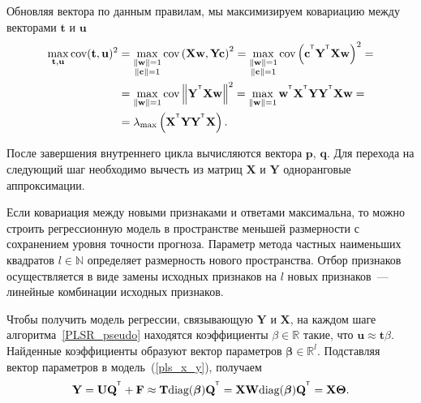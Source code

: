 \documentclass[12pt,twoside]{article}
\newcommand{\bw}{\mathbf{w}}
\newcommand{\bY}{\mathbf{Y}}
\newcommand{\bX}{\mathbf{X}}
\newcommand{\bu}{\mathbf{u}}
\newcommand{\bt}{\mathbf{t}}
\newcommand{\bp}{\mathbf{p}}
\newcommand{\bq}{\mathbf{q}}
\newcommand{\bc}{\mathbf{c}}
\newcommand{\bT}{\mathbf{T}}
\newcommand{\bQ}{\mathbf{Q}}
\newcommand{\bF}{\mathbf{F}}
\newcommand{\bU}{\mathbf{U}}
\newcommand{\bW}{\mathbf{W}}
\newcommand{\bTheta}{\boldsymbol{\Theta}}
\begin{document}
Обновляя вектора по данным правилам, мы максимизируем ковариацию между векторами $\bt$ и $\bu$
\begin{align*}
    \max_{\bt, \bu}  \text{cov} (\bt, \bu)^2 &= \max_{\substack{\|\bw\|=1 \\ \|\bc\| = 1}} \text{cov} \left( \bX \bw, \bY \bc \right)^2 = \max_{\substack{\|\bw\|=1 \\ \|\bc\| = 1}} \text{cov} \left(\bc^{\T}  \bY^{\T} \bX \bw \right)^2 = \\
    &= \max_{\|\bw\| = 1} \text{cov} \left\|\bY^{\T} \bX \bw \right\|^2 = \max_{\|\bw\| = 1} \bw^{\T} \bX^{\T} \bY \bY^{\T} \bX \bw = \\
    & = \lambda_{\max} \left( \bX^{\T} \bY \bY^{\T} \bX \right).
\end{align*}

После завершения внутреннего цикла вычисляются вектора $\bp$, $\bq$. Для перехода на следующий шаг необходимо вычесть из матриц $\bX$ и $\bY$ одноранговые аппроксимации.

Если ковариация между новыми признаками и ответами максимальна, то можно строить регрессионную модель в пространстве меньшей размерности с сохранением уровня точности прогноза. Параметр метода частных наименьших квадратов $l \in \mathbb{N}$ определяет размерность нового пространства. Отбор признаков осуществляется в виде замены исходных признаков на $l$ новых признаков~--- линейные комбинации исходных признаков.


Чтобы получить модель регрессии, связывающую $\bY$ и $\bX$, на каждом шаге алгоритма~\ref{PLSR_pseudo} находятся коэффициенты $\beta \in  \mathbb{R}$ такие, что $\bu \approx \bt \beta$. Найденные коэффициенты образуют вектор параметров $\boldsymbol{\beta} \in \mathbb{R}^l$. 
Подставляя вектор параметров в модель~(\ref{pls_x_y}), получаем
$$
    \bY = \bU\bQ^{\T}  + \bF \approx \bT \text{diag}(\boldsymbol{\beta}) \bQ^{\T} = \bX \bW \text{diag}(\boldsymbol{\beta}) \bQ^{\T} = \bX \bTheta.
$$
\end{document}
